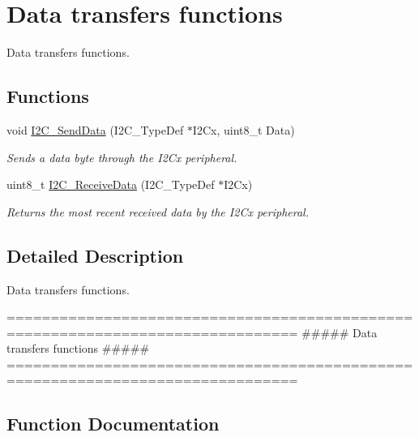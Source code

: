 \hypertarget{group___i2_c___group2}{}\section{Data transfers functions}
\label{group___i2_c___group2}


Data transfers functions.  


\subsection*{Functions}
\begin{DoxyCompactItemize}
\item 
void \mbox{\hyperlink{group___i2_c___group2_ga7bd9e70b8eafde0dd5eb42b0d95fe1a9}{I2\+C\+\_\+\+Send\+Data}} (I2\+C\+\_\+\+Type\+Def $\ast$I2\+Cx, uint8\+\_\+t Data)
\begin{DoxyCompactList}\small\item\em Sends a data byte through the I2\+Cx peripheral. \end{DoxyCompactList}\item 
uint8\+\_\+t \mbox{\hyperlink{group___i2_c___group2_gaeaaa4b6f77f50eb57465148c55d27fb2}{I2\+C\+\_\+\+Receive\+Data}} (I2\+C\+\_\+\+Type\+Def $\ast$I2\+Cx)
\begin{DoxyCompactList}\small\item\em Returns the most recent received data by the I2\+Cx peripheral. \end{DoxyCompactList}\end{DoxyCompactItemize}


\subsection{Detailed Description}
Data transfers functions. 

\begin{DoxyVerb} ===============================================================================
                  ##### Data transfers functions #####
 ===============================================================================  \end{DoxyVerb}
 

\subsection{Function Documentation}
\mbox{\label{group___i2_c___group2_gaeaaa4b6f77f50eb57465148c55d27fb2}} 
